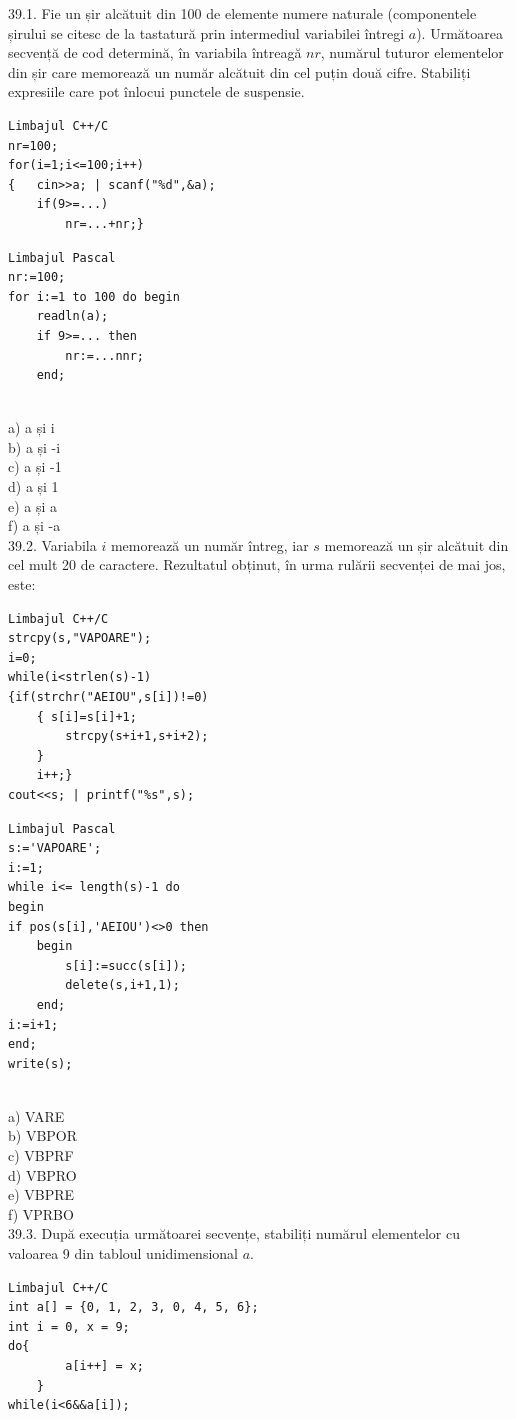 \begin{itemize}
\begin{enumerate}
39.1. Fie un șir alcătuit din 100 de elemente numere naturale (componentele șirului se citesc de la tastatură prin intermediul variabilei întregi $a$). Următoarea secvență de cod determină, în variabila întreagă $nr$, numărul tuturor elementelor din șir care memorează un număr alcătuit din cel puțin două cifre. Stabiliți expresiile care pot înlocui punctele de suspensie.
\begin{verbatim}
Limbajul C++/C
nr=100;
for(i=1;i<=100;i++)
{   cin>>a; | scanf("%d",&a);
    if(9>=...)
        nr=...+nr;}
\end{verbatim}
\begin{verbatim}
Limbajul Pascal
nr:=100;
for i:=1 to 100 do begin
    readln(a);
    if 9>=... then
        nr:=...nnr;
    end;
\end{verbatim}
\\
a) a și i
\\
b) a și -i
\\
c) a și -1
\\
d) a și 1
\\
e) a și a
\\
f) a și -a
\\
39.2. Variabila $i$ memorează un număr întreg, iar $s$ memorează un șir alcătuit din cel mult 20 de caractere. Rezultatul obținut, în urma rulării secvenței de mai jos, este:
\begin{verbatim}
Limbajul C++/C
strcpy(s,"VAPOARE");
i=0;
while(i<strlen(s)-1)
{if(strchr("AEIOU",s[i])!=0)
    { s[i]=s[i]+1;
        strcpy(s+i+1,s+i+2);
    }
    i++;}
cout<<s; | printf("%s",s);
\end{verbatim}
\begin{verbatim}
Limbajul Pascal
s:='VAPOARE';
i:=1;
while i<= length(s)-1 do
begin
if pos(s[i],'AEIOU')<>0 then
    begin
        s[i]:=succ(s[i]);
        delete(s,i+1,1);
    end;
i:=i+1;
end;
write(s);
\end{verbatim}
\\
a) VARE
\\
b) VBPOR
\\
c) VBPRF
\\
d) VBPRO
\\
e) VBPRE
\\
f) VPRBO
\\
39.3. După execuția următoarei secvențe, stabiliți numărul elementelor cu valoarea 9 din tabloul unidimensional $a$.
\begin{verbatim}
Limbajul C++/C
int a[] = {0, 1, 2, 3, 0, 4, 5, 6};
int i = 0, x = 9;
do{
        a[i++] = x;
    }
while(i<6&&a[i]);
\end{verbatim}

\end{enumerate}
\end{itemize}
